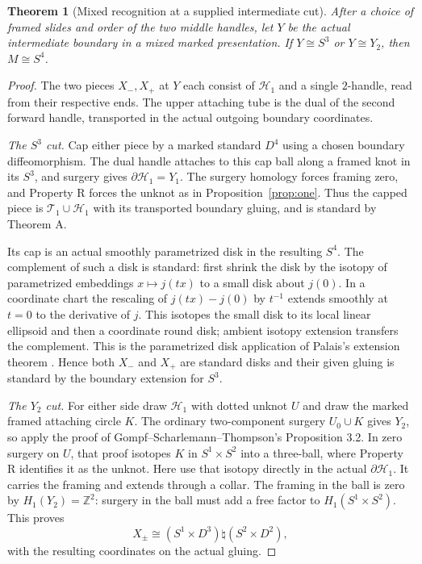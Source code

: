 \documentclass[11pt,letterpaper]{article}
\numberwithin{equation}{section}
\newtheorem{theorem}{Theorem}[section]
\newcommand{\HB}[1]{\mathcal H_{#1}}
\newcommand{\TB}[1]{\mathcal T_{#1}}
\begin{document}
\begin{theorem}[Mixed recognition at a supplied intermediate cut]\label{thm:mixed}
After a choice of framed slides and order of the two middle handles,
let \(Y\) be the actual intermediate boundary in a mixed marked
presentation. If \(Y\cong S^3\) or \(Y\cong Y_2\), then \(M\cong S^4\).
\end{theorem}

\begin{proof}
The two pieces \(X_-,X_+\) at \(Y\) each consist of \(\HB{1}\)
and a single \(2\)-handle, read from their respective ends. The
upper attaching tube is the dual of the second forward handle,
transported in the actual outgoing boundary coordinates.

\emph{The \(S^3\) cut.}
Cap either piece by a marked standard \(D^4\) using a chosen
boundary diffeomorphism. The dual handle attaches to this cap ball
along a framed knot in its \(S^3\), and surgery gives
\(\partial\HB{1}=Y_1\). The surgery homology forces framing zero,
and Property R forces the unknot as in Proposition~\ref{prop:one}.
Thus the capped piece is \(\TB{1}\cup\HB{1}\) with its
transported boundary gluing, and is standard by Theorem A.

Its cap is an actual smoothly parametrized disk in the resulting
\(S^4\). The complement of such a disk is standard: first shrink
the disk by the isotopy of parametrized embeddings \(x\mapsto j(tx)\)
to a small disk about \(j(0)\). In a coordinate chart the rescaling
of \(j(tx)-j(0)\) by \(t^{-1}\) extends smoothly at \(t=0\) to
the derivative of \(j\). This isotopes the small disk to its
local linear ellipsoid and then a coordinate round disk; ambient
isotopy extension transfers the complement. This is the
parametrized disk application of Palais's extension theorem
\cite[Theorem B]{Palais1960Extending}. Hence both \(X_-\) and
\(X_+\) are standard disks and their given gluing is standard by
the boundary extension for \(S^3\).

\emph{The \(Y_2\) cut.}
For either side draw \(\HB{1}\) with dotted unknot \(U\) and
draw the marked framed attaching circle \(K\). The ordinary
two-component surgery \(U_0\cup K\) gives \(Y_2\), so apply the
proof of Gompf--Scharlemann--Thompson's Proposition 3.2. In zero
surgery on \(U\), that proof isotopes \(K\) in \(S^1\times S^2\)
into a three-ball, where Property R identifies it as the unknot.
Here use that isotopy directly in the actual \(\partial\HB{1}\).
It carries the framing and extends through a collar. The framing
in the ball is zero by \(H_1(Y_2)=\mathbb Z^2\): surgery in the
ball must add a free factor to \(H_1(S^1\times S^2)\).
This proves
\[
 X_\pm\cong (S^1\times D^3)\natural(S^2\times D^2),
\]
with the resulting coordinates on the actual gluing.


\end{proof}
\end{document}
